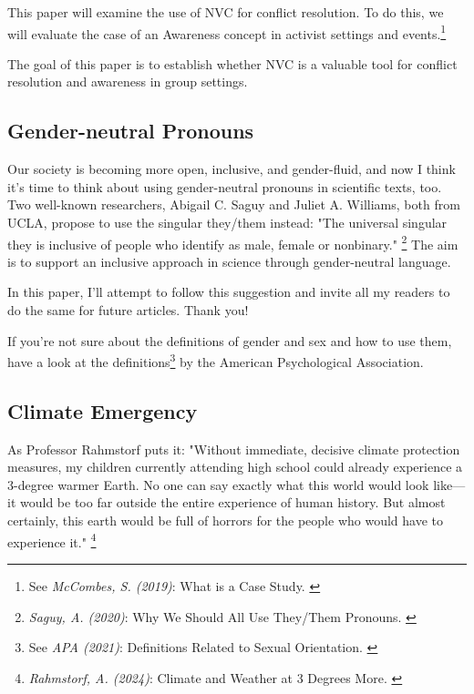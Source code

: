 This paper will examine the use of NVC for conflict resolution. To do this, we will evaluate the case of an Awareness concept in activist settings and events.\footnote{See \textit{McCombes, S. (2019)}: What is a Case Study. \cite{caseScribbr}}

The goal of this paper is to establish whether NVC is a valuable tool for conflict resolution and awareness in group settings.

\subsection{Gender-neutral Pronouns}

Our society is becoming more open, inclusive, and gender-fluid, and now I think it's time to think about using gender-neutral pronouns in scientific texts, too. Two well-known researchers, Abigail C. Saguy and Juliet A. Williams, both from UCLA, propose to use the singular they/them instead: "The universal singular they is inclusive of people who identify as male, female or nonbinary." \footnote{\textit{Saguy, A. (2020)}: Why We Should All Use They/Them Pronouns. \cite{pronouns}} The aim is to support an inclusive approach in science through gender-neutral language. 

In this paper, I'll attempt to follow this suggestion and invite all my readers to do the same for future articles. Thank you!

If you're not sure about the definitions of gender and sex and how to use them, have a look at the definitions\footnote{See \textit{APA (2021)}: Definitions Related to Sexual Orientation. \cite{apaDefinitions}} by the American Psychological Association.

\subsection{Climate Emergency}

As Professor Rahmstorf puts it: "Without immediate, decisive climate protection measures, my children currently attending high school could already experience a 3-degree warmer Earth. No one can say exactly what this world would look like—it would be too far outside the entire experience of human history. But almost certainly, this earth would be full of horrors for the people who would have to experience it." \footnote{\textit{Rahmstorf, A. (2024)}: Climate and Weather at 3 Degrees More. \cite{3dgreesMore}}
